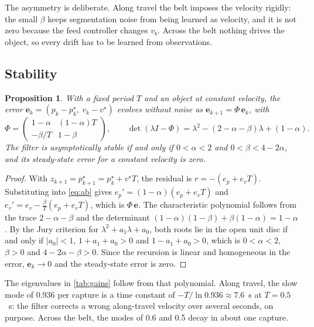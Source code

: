 \documentclass[11pt,a4paper]{article}
\newtheorem{proposition}{Proposition}
\theoremstyle{definition}
\theoremstyle{remark}
\begin{document}
The asymmetry is deliberate. Along travel the belt imposes the velocity rigidly:
the small $\beta$ keeps segmentation noise from being learned as velocity, and
it is not zero because the feed controller changes $v_b$. Across the belt nothing
drives the object, so every drift has to be learned from observations.

\subsection{Stability}

\begin{proposition}
\label{prop:stability}
With a fixed period $T$ and an object at constant velocity, the error
$\mathbf{e}_k = (p_k - p^\star_k,\ v_k - v^\star)$ evolves without noise as
$\mathbf{e}_{k+1} = \Phi\,\mathbf{e}_k$, with
\begin{equation}
\Phi = \begin{pmatrix} 1-\alpha & (1-\alpha)T \\ -\beta/T & 1-\beta \end{pmatrix},
\qquad
\det(\lambda I - \Phi) = \lambda^2 - (2-\alpha-\beta)\lambda + (1-\alpha).
\end{equation}
The filter is asymptotically stable if and only if $0<\alpha<2$ and
$0<\beta<4-2\alpha$, and its steady-state error for a constant velocity is zero.
\end{proposition}
\begin{proof}
With $z_{k+1} = p^\star_{k+1} = p^\star_k + v^\star T$, the residual is
$r = -(e_p + e_v T)$. Substituting into \eqref{eq:ab} gives
$e_p' = (1-\alpha)(e_p + e_v T)$ and
$e_v' = e_v - \tfrac{\beta}{T}(e_p + e_v T)$, which is $\Phi\,\mathbf e$. The
characteristic polynomial follows from the trace $2-\alpha-\beta$ and the
determinant $(1-\alpha)(1-\beta) + \beta(1-\alpha) = 1-\alpha$. By the Jury
criterion for $\lambda^2 + a_1\lambda + a_0$, both roots lie in the open unit
disc if and only if $|a_0|<1$, $1+a_1+a_0>0$ and $1-a_1+a_0>0$, which is
$0<\alpha<2$, $\beta>0$ and $4 - 2\alpha - \beta > 0$. Since the recursion is
linear and homogeneous in the error, $\mathbf e_k\to 0$ and the steady-state
error is zero.
\end{proof}

The eigenvalues in \cref{tab:gains} follow from that polynomial. Along travel,
the slow mode of 0.936 per capture is a time constant of
$-T/\ln 0.936 \approx 7.6$~s at $T = 0.5$~s: the filter corrects a wrong
along-travel velocity over several seconds, on purpose. Across the belt, the
modes of 0.6 and 0.5 decay in about one capture.
\end{document}
